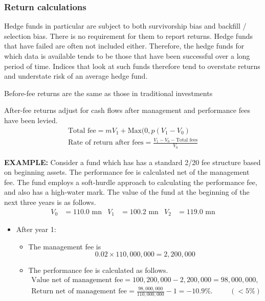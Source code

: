\documentclass[../notes_compiled.tex]{subfiles}
\begin{document}
\subsubsection{Return calculations}
\begin{itemize}
\item Hedge funds in particular are subject to both survivorship bias and backfill / selection bias. There is no requirement for them to report returns. Hedge funds that have failed are often not included either. Therefore, the hedge funds for which data is available tends to be those that have been successful over a long period of time. Indices that look at such funds therefore tend to overstate returns and understate risk of an average hedge fund.
\item Before-fee returns are the same as those in traditional investments
\item After-fee returns adjust for cash flows after management and performance fees have been levied.
\begin{gather}
\text{Total fee} = mV_{1} + \text{Max}(0, p(V_{1}-V_{0}) \\
\text{Rate of return after fees} = \frac{V_{1}-V_{0}-\text{Total fees}}{V_{0}}
\end{gather}
{\color{RedViolet}
\item[] \textbf{EXAMPLE:} Consider a fund which has has a standard 2/20 fee structure based on beginning assets. The performance fee is calculated net of the management fee. The fund employs a soft-hurdle approach to calculating the performance fee, and also has a high-water mark. The value of the fund at the beginning of the next three years is as follows.
\begin{align*}
V_{0}&=110.0\text{ mn} & V_{1}&=100.2\text{ mn} & V_{2}&=119.0\text{ mn}
\end{align*}
}
{\color{RoyalBlue}
\begin{itemize}
\item After year 1:
\begin{itemize}
\item The management fee is
\begin{equation*}
0.02 \times 110,000,000 = 2,200,000
\end{equation*}
\item The performance fee is calculated as follows.
\begin{gather*}
\text{Value net of management fee} = 100,200,000 - 2,200,000 = 98,000,000, \\
\text{Return net of management fee} = \frac{98,000,000}{110,000,000}-1 = -10.9\%. \hspace{1cm} (<5\%)

\end{gather*}
\end{itemize}
\end{itemize}}
\end{itemize}
\end{document}
